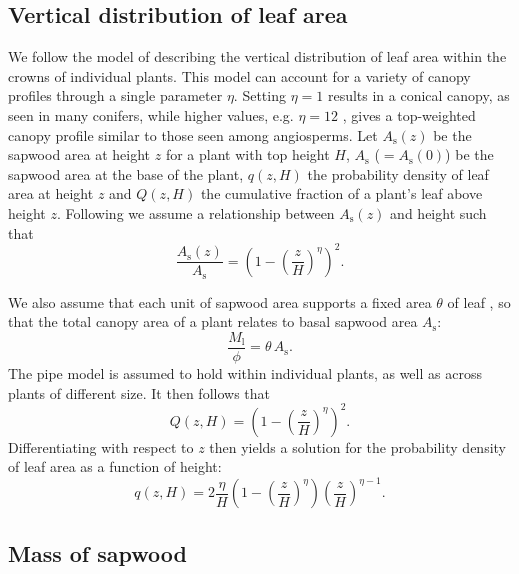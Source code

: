 \documentclass[10pt,twoside]{article}
\begin{document}
\subsection{Vertical distribution of leaf
area}\label{vertical-distribution-of-leaf-area}

We follow the model of \citet{Yokozawa-1995} describing the vertical
distribution of leaf area within the crowns of individual plants. This
model can account for a variety of canopy profiles through a single
parameter \(\eta\). Setting \(\eta = 1\) results in a conical canopy, as
seen in many conifers, while higher values, e.g. \(\eta = 12\) , gives a
top-weighted canopy profile similar to those seen among angiosperms. Let
\(A_\textrm{s}(z)\) be the sapwood area at height \(z\) for a plant with
top height \(H\), \(A_\textrm{s}\) ($= A_\textrm{s}(0)$) be the sapwood
area at the base of the plant, \(q(z, H)\) the probability density of
leaf area at height \(z\) and \(Q(z, H)\) the cumulative fraction of a
plant's leaf above height \(z\). Following \citet{Yokozawa-1995} we
assume a relationship between \(A_\textrm{s}(z)\) and height such that
\begin{equation}\label{eq:crown1}
\frac{A_\textrm{s}(z)}{A_\textrm{s}} = \left(1 - \left(\frac{z}{H}\right)^\eta\right)^2.
\end{equation}

We also assume that each unit of sapwood area supports a fixed area \(\theta\) of
leaf \citep[the pipe model][]{Shinozaki-1964}, so that the total canopy
area of a plant relates to basal sapwood area \(A_\textrm{s}\):
\begin{equation}\label{eq:crown2}
\frac{M_\textrm{l}}{\phi} = \theta \, A_\textrm{s}.
\end{equation}
The pipe model is assumed to hold within individual plants, as well as
across plants of different size. It then follows that
\begin{equation}\label{eq:crown1}
Q(z, H) = \left(1-\left(\frac{z}{H}\right)^\eta\right)^2.
\end{equation}
Differentiating with respect to \(z\) then yields a solution for the
probability density of leaf area as a function of height:
\begin{equation}\label{eq:crown3}
q(z, H) = 2\frac{\eta}{H}\left(1-\left(\frac{z}{H}\right)^{\eta}\right) \left(\frac{z}{H}\right)^{\eta-1}.
\end{equation}

\subsection{Mass of sapwood}\label{mass-of-sapwood}
\end{document}
